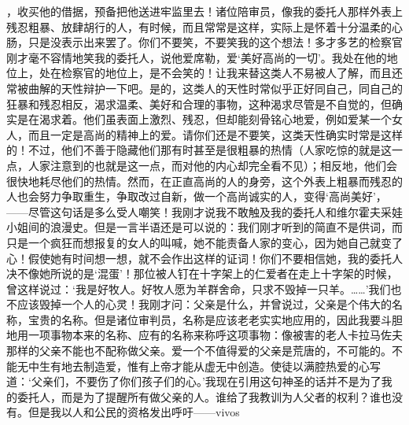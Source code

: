 ，收买他的借据，预备把他送进牢监里去！诸位陪审员，像我的委托人那样外表上残忍粗暴、放肆胡行的人，有时候，而且常常是这样，实际上是怀着十分温柔的心肠，只是没表示出来罢了。你们不要笑，不要笑我的这个想法！多才多艺的检察官刚才毫不容情地笑我的委托人，说他爱席勒，爱‘美好高尚的一切’。我处在他的地位上，处在检察官的地位上，是不会笑的！让我来替这类人不易被人了解，而且还常被曲解的天性辩护一下吧。是的，这类人的天性时常似乎正好同自己，同自己的狂暴和残忍相反，渴求温柔、美好和合理的事物，这种渴求尽管是不自觉的，但确实是在渴求着。他们虽表面上激烈、残忍，但却能刻骨铭心地爱，例如爱某一个女人，而且一定是高尚的精神上的爱。请你们还是不要笑，这类天性确实时常是这样的！不过，他们不善于隐藏他们那有时甚至是很粗暴的热情（人家吃惊的就是这一点，人家注意到的也就是这一点，而对他的内心却完全看不见）；相反地，他们会很快地耗尽他们的热情。然而，在正直高尚的人的身旁，这个外表上粗暴而残忍的人也会努力争取重生，争取改过自新，做一个高尚诚实的人，变得‘高尚美好’，——尽管这句话是多么受人嘲笑！我刚才说我不敢触及我的委托人和维尔霍夫采娃小姐间的浪漫史。但是一言半语还是可以说的：我们刚才听到的简直不是供词，而只是一个疯狂而想报复的女人的叫喊，她不能责备人家的变心，因为她自己就变了心！假使她有时间想一想，就不会作出这样的证词！你们不要相信她，我的委托人决不像她所说的是‘混蛋’！那位被人钉在十字架上的仁爱者在走上十字架的时候，曾这样说过：‘我是好牧人。好牧人愿为羊群舍命，只求不毁掉一只羊。……’我们也不应该毁掉一个人的心灵！我刚才问：父亲是什么，并曾说过，父亲是个伟大的名称，宝贵的名称。但是诸位审判员，名称是应该老老实实地应用的，因此我要斗胆地用一项事物本来的名称、应有的名称来称呼这项事物：像被害的老人卡拉马佐夫那样的父亲不能也不配称做父亲。爱一个不值得爱的父亲是荒唐的，不可能的。不能无中生有地去制造爱，惟有上帝才能从虚无中创造。使徒以满腔热爱的心写道：‘父亲们，不要伤了你们孩子们的心。’我现在引用这句神圣的话并不是为了我的委托人，而是为了提醒所有做父亲的人。谁给了我教训为人父者的权利？谁也没有。但是我以人和公民的资格发出呼吁——vivos 